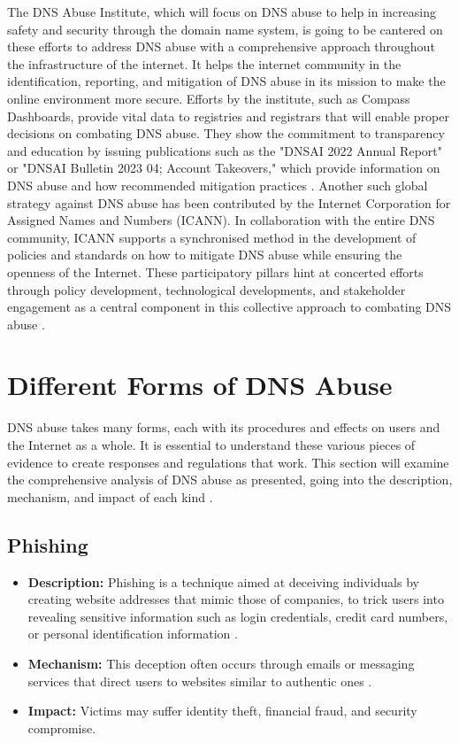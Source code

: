 The DNS Abuse Institute, which will focus on DNS abuse to help in increasing safety and security through the domain name system, is going to be cantered on these efforts to address DNS abuse with a comprehensive approach throughout the infrastructure of the internet. It helps the internet community in the identification, reporting, and mitigation of DNS abuse in its mission to make the online environment more secure. Efforts by the institute, such as Compass Dashboards, provide vital data to registries and registrars that will enable proper decisions on combating DNS abuse. They show the commitment to transparency and education by issuing publications such as the "DNSAI 2022 Annual Report" or "DNSAI Bulletin 2023 04; Account Takeovers," which provide information on DNS abuse and how recommended mitigation practices \cite{dnsabuseinstitute2023}. Another such global strategy against DNS abuse has been contributed by the Internet Corporation for Assigned Names and Numbers (ICANN)\cite{icann2022dnsabuse}. In collaboration with the entire DNS community, ICANN supports a synchronised method in the development of policies and standards on how to mitigate DNS abuse while ensuring the openness of the Internet. These participatory pillars hint at concerted efforts through policy development, technological developments, and stakeholder engagement as a central component in this collective approach to combating DNS abuse \cite{dnsai2022report}. 



\section{Different Forms of DNS Abuse}

DNS abuse takes many forms, each with its procedures and effects on users and the Internet as a whole. It is essential to understand these various pieces of evidence to create responses and regulations that work. This section will examine the comprehensive analysis of DNS abuse as presented, going into the description, mechanism, and impact of each kind \cite{dotmagazine2022dnsabuse}.

\subsection{Phishing}
\begin{itemize}
    \item \textbf{Description:} Phishing is a technique aimed at deceiving individuals by creating website addresses that mimic those of companies, to trick users into revealing sensitive information such as login credentials, credit card numbers, or personal identification information \cite{webinarcare2023dnsstats}.
    \item \textbf{Mechanism:} This deception often occurs through emails or messaging services that direct users to websites similar to authentic ones \cite{jakobsson2006phishing}.
    \item \textbf{Impact:} Victims may suffer identity theft, financial fraud, and security compromise.
\end{itemize}

